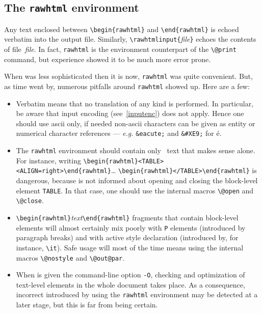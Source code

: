 \subsection{The \texttt{rawhtml}\label{rawhtml} environment}
Any text enclosed between \verb+\begin{rawhtml}+ and
\verb+\end{rawhtml}+ is echoed verbatim into the \html{} output file.
Similarly, \verb+\rawhtmlinput{+\textit{file}\verb+}+ echoes the
contents of file~\textit{file}.
In fact, \verb+rawhtml+ is the environment counterpart of the
\verb+\@print+ command, but experience showed it to be much more
error prone.

When \hevea{} was less sophisticated then it is now,
\texttt{rawhtml} was quite convenient.
But, as time went by,
numerous pitfalls around \texttt{rawhtml} showed up. Here are a few:
\begin{itemize}
\item
Verbatim means that no translation of any kind is performed. In
particular, be aware that input encoding (see~\ref{inputenc}) does
not apply. Hence one should use ascii only, if needed
non-ascii characters can be given as
entity or numerical character references --- \emph{e.g.}
\verb+&eacute;+ and \verb+&#XE9;+ for \'e.

\item
The \texttt{rawhtml}
environment should contain only \html~text that makes sense alone.
For instance, writing
\verb+\begin{rawhtml}<TABLE><ALIGN=right>\end{rawhtml}+\ldots{}
\verb+\begin{rawhtml}</TABLE>\end{rawhtml}+ is
dangerous, because \hevea{} is not informed about opening and closing
the block-level element \texttt{TABLE}. In that case, one should use
the internal macros \verb+\@open+ and \verb+\@close+.

\item \verb+\begin{rawhtml}+\textit{text}\verb+\end{rawhtml}+ fragments that
contain block-level elements will almost certainly mix poorly with
\verb+P+ elements (introduced by paragraph breaks) and with active
style declaration (introduced by, for instance, \verb+\it+).
Safe usage will most of the time means using the internal macros
\verb+\@nostyle+ and \verb+\@out@par+.

\item When \hevea{} is given the command-line option \texttt{-O},
checking and optimization of text-level elements in the whole document
takes place.  As a consequence, incorrect \html{} introduced by using
the \texttt{rawhtml} environment may be detected at a later stage,
but this is far from being certain.
\end{itemize}

